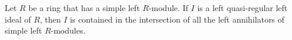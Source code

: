 Let $R$ be a ring that has a simple left $R$-module. If $I$ is a left quasi-regular left ideal of $R$, then $I$ is contained in the intersection of all the left annihilators of simple left $R$-modules.
